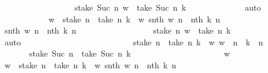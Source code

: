 \begin{isabellebody}
\ \ \ \ \ \ \ \ \ \ \ \ \ \ \ \ \ \ {\isacartoucheopen}stake\ {\isacharparenleft}{\kern0pt}Suc\ n{\isacharparenright}{\kern0pt}\ w\ {\isacharequal}{\kern0pt}\ take\ {\isacharparenleft}{\kern0pt}Suc\ n{\isacharparenright}{\kern0pt}\ k{\isacartoucheclose}\isanewline
\ \ \ \ \ \ \ \ \ \ \ \ \isamarkupfalse%
\ auto\isanewline
\ \ \ \ \ \ \ \ \ \ \isamarkupfalse%
\ {\isachardoublequoteopen}w\ {\isasymin}\ {\isacharparenleft}{\kern0pt}stake\ n\ {\isacharminus}{\kern0pt}{\isacharbackquote}{\kern0pt}\ {\isacharbraceleft}{\kern0pt}take\ n\ k{\isacharbraceright}{\kern0pt}{\isacharparenright}{\kern0pt}\ {\isasyminter}\ {\isacharparenleft}{\kern0pt}{\isacharparenleft}{\kern0pt}{\isasymlambda}w{\isachardot}{\kern0pt}\ snth\ w\ n{\isacharparenright}{\kern0pt}\ {\isacharminus}{\kern0pt}{\isacharbackquote}{\kern0pt}\ {\isacharbraceleft}{\kern0pt}nth\ k\ n{\isacharbraceright}{\kern0pt}{\isacharparenright}{\kern0pt}{\isachardoublequoteclose}\isanewline
\ \ \ \ \ \ \ \ \ \ \ \ \isamarkupfalse%
\ {\isacartoucheopen}snth\ w\ n\ {\isacharequal}{\kern0pt}\ nth\ k\ n{\isacartoucheclose}\isanewline
\ \ \ \ \ \ \ \ \ \ \ \ \ \ \ \ \ \ {\isacartoucheopen}stake\ n\ w\ {\isacharequal}{\kern0pt}\ take\ n\ k{\isacartoucheclose}\isanewline
\ \ \ \ \ \ \ \ \ \ \ \ \isamarkupfalse%
\ auto\isanewline
\ \ \ \ \ \ \ \ \isamarkupfalse%
\isanewline
\ \ \ \ \ \ \isamarkupfalse%
\ \isanewline
\ \ \ \ \ \ \ \ \isamarkupfalse%
\ {\isachardoublequoteopen}stake\ n\ {\isacharminus}{\kern0pt}{\isacharbackquote}{\kern0pt}\ {\isacharbraceleft}{\kern0pt}take\ n\ k{\isacharbraceright}{\kern0pt}\ {\isasyminter}\ {\isacharparenleft}{\kern0pt}{\isasymlambda}w{\isachardot}{\kern0pt}\ w\ {\isacharbang}{\kern0pt}{\isacharbang}{\kern0pt}\ n{\isacharparenright}{\kern0pt}\ {\isacharminus}{\kern0pt}{\isacharbackquote}{\kern0pt}\ {\isacharbraceleft}{\kern0pt}k\ {\isacharbang}{\kern0pt}\ n{\isacharbraceright}{\kern0pt}\isanewline
\ \ \ \ \ \ {\isasymsubseteq}\ stake\ {\isacharparenleft}{\kern0pt}Suc\ n{\isacharparenright}{\kern0pt}\ {\isacharminus}{\kern0pt}{\isacharbackquote}{\kern0pt}\ {\isacharbraceleft}{\kern0pt}take\ {\isacharparenleft}{\kern0pt}Suc\ n{\isacharparenright}{\kern0pt}\ k{\isacharbraceright}{\kern0pt}{\isachardoublequoteclose}\isanewline
\ \ \ \ \ \ \ \ \isamarkupfalse%
\ \isanewline
\ \ \ \ \ \ \ \ \ \ \isamarkupfalse%
\ w\isanewline
\ \ \ \ \ \ \ \ \ \ \isamarkupfalse%
\ {\isachardoublequoteopen}w\ {\isasymin}\ {\isacharparenleft}{\kern0pt}stake\ n\ {\isacharminus}{\kern0pt}{\isacharbackquote}{\kern0pt}\ {\isacharbraceleft}{\kern0pt}take\ n\ k{\isacharbraceright}{\kern0pt}{\isacharparenright}{\kern0pt}\ {\isasyminter}\ {\isacharparenleft}{\kern0pt}{\isacharparenleft}{\kern0pt}{\isasymlambda}w{\isachardot}{\kern0pt}\ snth\ w\ n{\isacharparenright}{\kern0pt}\ {\isacharminus}{\kern0pt}{\isacharbackquote}{\kern0pt}\ {\isacharbraceleft}{\kern0pt}nth\ k\ n{\isacharbraceright}{\kern0pt}{\isacharparenright}{\kern0pt}{\isachardoublequoteclose}\isanewline

\end{isabellebody}
